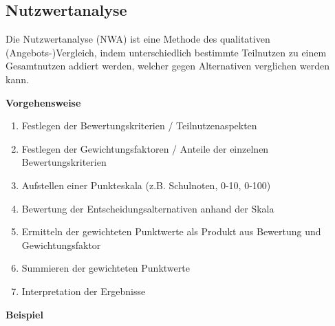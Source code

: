 \subsection{Nutzwertanalyse}
Die Nutzwertanalyse (NWA) ist eine Methode des qualitativen (Angebots-)Vergleich, indem unterschiedlich bestimmte Teilnutzen zu einem Gesamtnutzen addiert werden, welcher gegen Alternativen verglichen werden kann.

\textbf{Vorgehensweise}

\begin{enumerate}
    \item Festlegen der Bewertungskriterien / Teilnutzenaspekten
    \item Festlegen der Gewichtungsfaktoren / Anteile der einzelnen Bewertungskriterien
    \item Aufstellen einer Punkteskala (z.B. Schulnoten, 0-10, 0-100)
    \item Bewertung der Entscheidungsalternativen anhand der Skala
    \item Ermitteln der gewichteten Punktwerte als Produkt aus Bewertung und Gewichtungsfaktor
    \item Summieren der gewichteten Punktwerte
    \item Interpretation der Ergebnisse
\end{enumerate}

\textbf{Beispiel}


